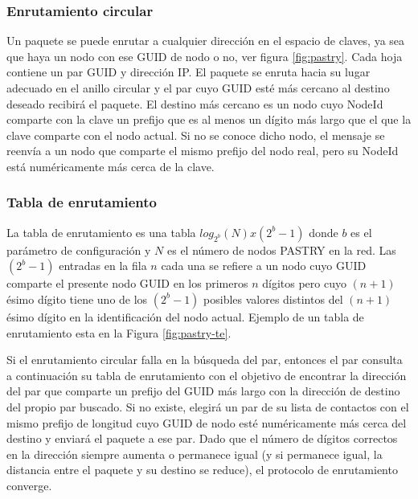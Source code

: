  
 \subsubsection{Enrutamiento circular}
  
 Un paquete se puede enrutar a cualquier dirección en el espacio de claves, ya sea que haya un nodo con ese GUID de nodo o no, ver figura \ref{fig:pastry}. Cada hoja contiene un par GUID y direcci\'on IP. 
  El paquete se enruta hacia su lugar adecuado en el anillo circular y el par cuyo GUID esté más cercano al destino deseado recibirá el paquete. El destino m\'as cercano es  un  nodo cuyo NodeId comparte con la clave un prefijo que es al menos un dígito más largo que el que la clave comparte con el nodo actual. 
   Si no se conoce dicho nodo, el mensaje se reenvía a un nodo que comparte el mismo prefijo del nodo real, pero su NodeId está numéricamente más cerca de la clave.
 
 
 \subsubsection{Tabla de enrutamiento  }
  La tabla de enrutamiento es una tabla $log_{2^{b}}(N) x (2^{b} - 1)$  donde $b$ es el parámetro de configuración y $N$ es el número de nodos PASTRY en la red.
 Las  $(2^{b} - 1)$ entradas en la fila $n$ cada una se refiere a un nodo cuyo GUID comparte el presente nodo GUID en los primeros $n$ dígitos  pero cuyo $(n + 1)$ésimo dígito tiene uno de los $(2^{b} - 1)$ posibles  valores distintos del $(n + 1)$ésimo dígito en la identificación del nodo actual. Ejemplo de un tabla de enrutamiento esta en la  Figura \ref{fig:pastry-te}. 
 
  Si el enrutamiento circular  falla en la b\'usqueda del par, entonces el par consulta a continuación su tabla de enrutamiento con el objetivo de encontrar la dirección del par que comparte un prefijo del GUID  más largo con la dirección de destino del propio par buscado. Si no existe, elegirá un par de su lista de contactos con el mismo prefijo de longitud cuyo GUID de nodo esté numéricamente más cerca del destino y enviará el paquete a ese par. Dado que el número de dígitos correctos en la dirección siempre aumenta o permanece igual (y si permanece igual, la distancia entre el paquete y su destino se reduce), el protocolo de enrutamiento converge.
  
